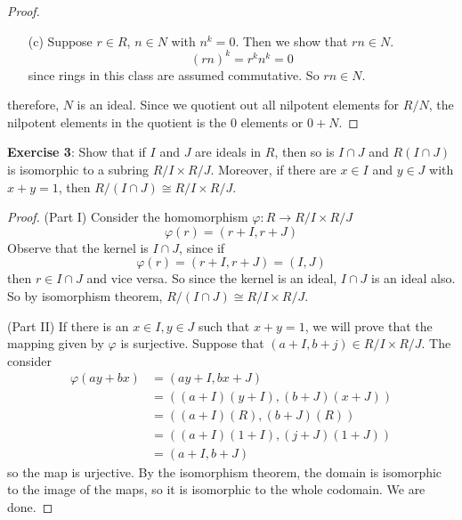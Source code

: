 \documentclass{article}
\begin{document}
\begin{enumerate}
\begin{proof}
\begin{enumerate}
                    \item [(c)] Suppose $r \in R$, $n \in N$ with $n^{k} = 0$. Then we show that $rn \in N$.
                        \begin{equation*}
                            (rn)^{k} = r^{k}n^{k} = 0
                        \end{equation*}
                        since rings in this class are assumed commutative. So $rn \in N$.
                \end{enumerate} 
                therefore, $N$ is an ideal. Since we quotient out all nilpotent elements for $R/N$, the nilpotent elements in the quotient is the 0 elements or $0 + N$.
            \end{proof}
    \end{enumerate}

\textbf{Exercise 3}: Show that if $I$ and $J$ are ideals in $R$, then so is $I \cap J$ and $R(I \cap J)$ is isomorphic to a subring $R/I \times R/J$. Moreover, if there are $x \in I$ and $y \in J$ with $x + y = 1$, then $R/(I \cap J) \cong R/I \times R/J$.
    \begin{proof}
        (Part I) Consider the homomorphism $\varphi : R \rightarrow R/I \times R/J$
        \begin{equation*}
            \varphi(r) = (r + I, r + J)
        \end{equation*}
        Observe that the kernel is $I \cap J$, since if 
        \begin{equation*}
            \varphi(r) = (r + I, r + J) = (I, J)
        \end{equation*}
        then $r \in I \cap J$ and vice versa. So since the kernel is an ideal, $I \cap J$ is an ideal also. So by isomorphism theorem, $R/(I \cap J) \cong R/I \times R/J$.

        (Part II) If there is an $x \in I, y \in J$ such that $x + y = 1$, we will prove that the mapping given by $\varphi$ is surjective. Suppose that $(a + I, b + j) \in R/I \times R/J$. The consider
        \begin{align*}
            \varphi(ay + bx) &= (ay + I, bx + J) \\
                             &= ((a + I)(y + I), (b + J)(x + J)) \\
                             &= ((a + I)(R), (b + J)(R)) \\
                             &= ((a + I)(1 + I), (j + J)(1 + J)) \\
                             &= (a + I, b + J)
        \end{align*}
        so the map is urjective. By the isomorphism theorem, the domain is isomorphic to the image of the maps, so it is isomorphic to the whole codomain. We are done. 
    \end{proof}
\end{document}
